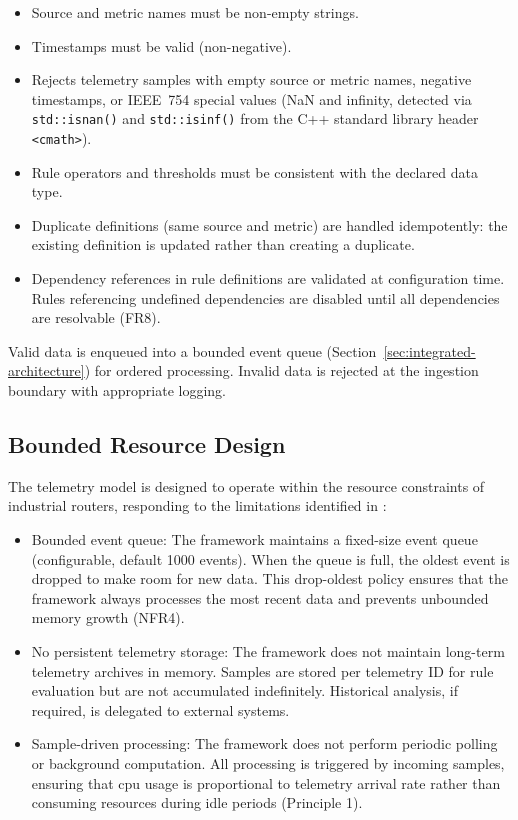 \begin{itemize}
\item Source and metric names must be non-empty strings.
\item Timestamps must be valid (non-negative).
\item Rejects telemetry samples with empty source or metric names, negative timestamps, or IEEE~754 special values (NaN and infinity, detected via \texttt{std::isnan()} and \texttt{std::isinf()} from the C++ standard library header \texttt{<cmath>}).
\item Rule operators and thresholds must be consistent with the declared data type.
\item Duplicate definitions (same source and metric) are handled idempotently: the existing definition is updated rather than creating a duplicate.
\item Dependency references in rule definitions are validated at configuration time. Rules referencing undefined dependencies are disabled until all dependencies are resolvable (FR8).
\end{itemize}

Valid data is enqueued into a bounded event queue (Section~\ref{sec:integrated-architecture}) for ordered processing. Invalid data is rejected at the ingestion boundary with appropriate logging.

\subsection{Bounded Resource Design}\label{sec:bounded-resource-design}

The telemetry model is designed to operate within the resource constraints of industrial routers, responding to the limitations identified in \cite{ref14,ref17}:

\begin{itemize}
\item Bounded event queue: The framework maintains a fixed-size event queue (configurable, default 1000 events). When the queue is full, the oldest event is dropped to make room for new data. This drop-oldest policy ensures that the framework always processes the most recent data and prevents unbounded memory growth (NFR4).
\item No persistent telemetry storage: The framework does not maintain long-term telemetry archives in memory. Samples are stored per telemetry ID for rule evaluation but are not accumulated indefinitely. Historical analysis, if required, is delegated to external systems.
\item Sample-driven processing: The framework does not perform periodic polling or background computation. All processing is triggered by incoming samples, ensuring that \gls{cpu} usage is proportional to telemetry arrival rate rather than consuming resources during idle periods (Principle 1).
\end{itemize}

